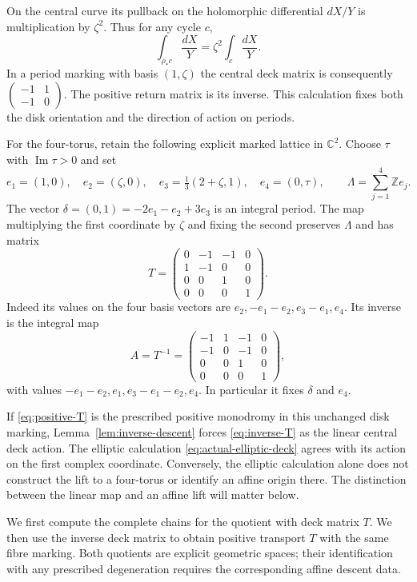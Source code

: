 On the central curve its pullback on the holomorphic differential
$dX/Y$ is multiplication by $\zeta^2$. Thus for any cycle $c$,
\[
 \int_{\rho_*c}\frac{dX}{Y}=\zeta^2\int_c\frac{dX}{Y}.
\]
In a period marking with basis $(1,\zeta)$ the central deck matrix
is consequently
$\left(\begin{smallmatrix}-1&1\\-1&0\end{smallmatrix}\right)$.
The positive return matrix is its inverse. This calculation fixes
both the disk orientation and the direction of action on periods.

For the four-torus, retain the following explicit marked lattice
in $\mathbb C^2$. Choose $\tau$ with $\operatorname{Im}\tau>0$ and set
\begin{equation}\label{eq:period-lattice}
 e_1=(1,0),\quad e_2=(\zeta,0),\quad
 e_3=\tfrac13(2+\zeta,1),\quad e_4=(0,\tau),
 \qquad \Lambda=\sum_{j=1}^4\mathbb Ze_j.
\end{equation}
The vector $\delta=(0,1)=-2e_1-e_2+3e_3$ is an integral
period. The map multiplying the first coordinate by $\zeta$ and
fixing the second preserves $\Lambda$ and has matrix
\begin{equation}\label{eq:positive-T}
 T=\begin{pmatrix}0&-1&-1&0\\1&-1&0&0\\0&0&1&0\\0&0&0&1\end{pmatrix}.
\end{equation}
Indeed its values on the four basis vectors are
$e_2,-e_1-e_2,e_3-e_1,e_4$. Its inverse is the integral map
\begin{equation}\label{eq:inverse-T}
 A=T^{-1}=
 \begin{pmatrix}-1&1&-1&0\\-1&0&-1&0\\0&0&1&0\\0&0&0&1\end{pmatrix},
\end{equation}
with values $-e_1-e_2,e_1,e_3-e_1-e_2,e_4$.
In particular it fixes $\delta$ and $e_4$.

If \eqref{eq:positive-T} is the prescribed positive monodromy in
this unchanged disk marking, Lemma~\ref{lem:inverse-descent}
forces \eqref{eq:inverse-T} as the linear central deck action.
The elliptic calculation \eqref{eq:actual-elliptic-deck} agrees
with its action on the first complex coordinate. Conversely, the
elliptic calculation alone does not construct the lift to a
four-torus or identify an affine origin there. The distinction
between the linear map and an affine lift will matter below.

We first compute the complete chains for the quotient with deck
matrix $T$. We then use the inverse deck matrix to obtain positive
transport $T$ with the same fibre marking. Both quotients are
explicit geometric spaces; their identification with any prescribed
degeneration requires the corresponding affine descent data.
